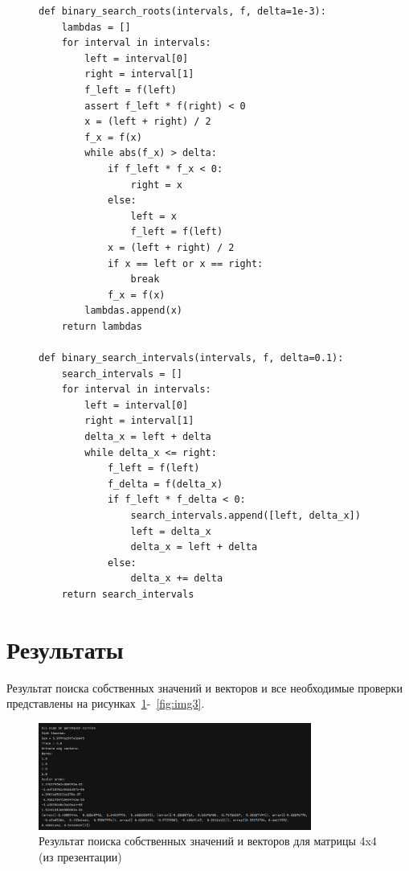\documentclass[a4paper, 14pt]{extarticle}
\begin{document}
\begin{figure}[H]
\begin{lstlisting}[language={},caption={Решение характеристического уравнения методом бинарного поиска},label={lst:code4}]
def binary_search_roots(intervals, f, delta=1e-3):
    lambdas = []
    for interval in intervals:
        left = interval[0]
        right = interval[1]
        f_left = f(left)
        assert f_left * f(right) < 0
        x = (left + right) / 2
        f_x = f(x)
        while abs(f_x) > delta:
            if f_left * f_x < 0:
                right = x
            else:
                left = x
                f_left = f(left)
            x = (left + right) / 2
            if x == left or x == right:
                break
            f_x = f(x)
        lambdas.append(x)
    return lambdas

def binary_search_intervals(intervals, f, delta=0.1):
    search_intervals = []
    for interval in intervals:
        left = interval[0]
        right = interval[1]
        delta_x = left + delta
        while delta_x <= right:
            f_left = f(left)
            f_delta = f(delta_x)
            if f_left * f_delta < 0:
                search_intervals.append([left, delta_x])
                left = delta_x
                delta_x = left + delta
            else:
                delta_x += delta
    return search_intervals
\end{lstlisting}
\end{figure}

\section{Результаты}

Результат поиска собственных значений и векторов и все необходимые проверки представлены на рисунках~\ref{fig:img1}-~\ref{fig:img3}.


\begin{figure}[H]
\centering
\includegraphics[width=0.8\textwidth]{images/res1.png}
\caption{Результат поиска собственных значений и векторов для матрицы 4x4 (из презентации)}
\label{fig:img1}
\end{figure}
\end{document}
